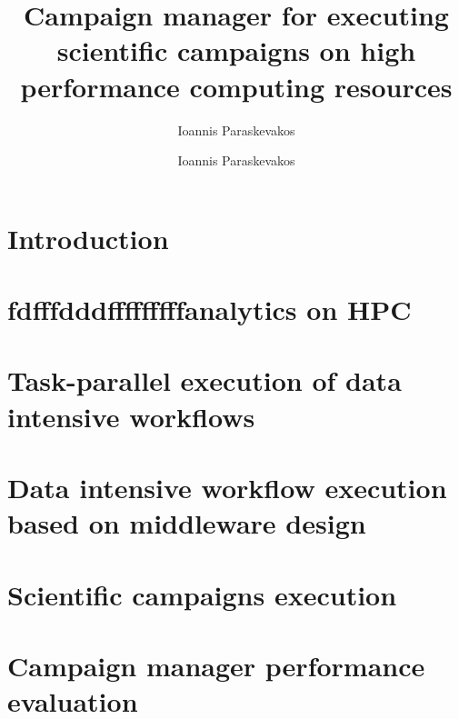 \documentclass{ruthesis}
\begin{document}
\author{Ioannis Paraskevakos}
\copyrightp
\title{Campaign manager for executing scientific campaigns on high performance computing resources}
\author{Ioannis Paraskevakos}					
\figurespage
\tablespage

\abstract{}
\acknowledgements{}

\beforepreface
\afterpreface

\chapter{Introduction}

\label{ch:intro}

\chapter{fdfffdddfffffffffanalytics on HPC}

\chapter{Task-parallel execution of data intensive workflows}

\chapter{Data intensive workflow execution based on middleware design}

\chapter{Scientific campaigns execution}

\chapter{Campaign manager performance evaluation}



\end{document}
